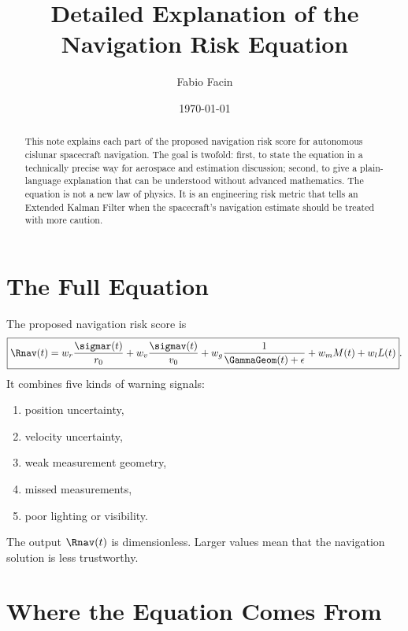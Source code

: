 \documentclass[11pt]{article}
\title{Detailed Explanation of the Navigation Risk Equation}
\author{Fabio Facin}
\date{\today}
\begin{document}
\maketitle

\begin{abstract}
This note explains each part of the proposed navigation risk score for
autonomous cislunar spacecraft navigation. The goal is twofold: first, to state
the equation in a technically precise way for aerospace and estimation
discussion; second, to give a plain-language explanation that can be understood
without advanced mathematics. The equation is not a new law of physics. It is
an engineering risk metric that tells an Extended Kalman Filter when the
spacecraft's navigation estimate should be treated with more caution.
\end{abstract}

\section{The Full Equation}

The proposed navigation risk score is
\begin{equation}
\boxed{
\Rnav(t)
=
w_r \frac{\sigmar(t)}{r_0}
+
w_v \frac{\sigmav(t)}{v_0}
+
w_g \frac{1}{\GammaGeom(t)+\epsilon}
+
w_m M(t)
+
w_l L(t)
}.
\end{equation}
It combines five kinds of warning signals:
\begin{enumerate}
  \item position uncertainty,
  \item velocity uncertainty,
  \item weak measurement geometry,
  \item missed measurements,
  \item poor lighting or visibility.
\end{enumerate}
The output $\Rnav(t)$ is dimensionless. Larger values mean that the navigation
solution is less trustworthy.

\section{Where the Equation Comes From}
\end{document}
